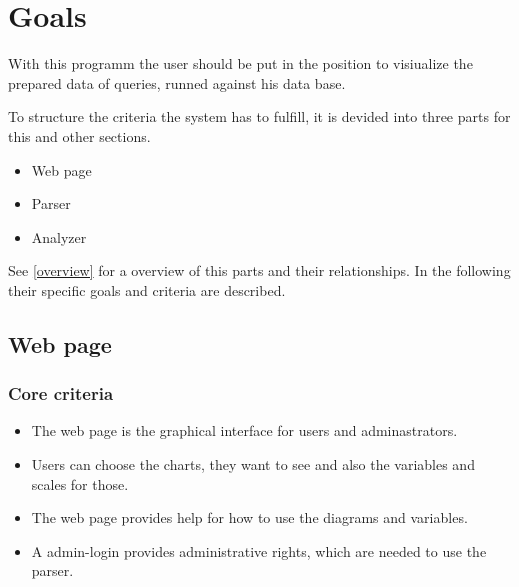 \section{Goals}


With this programm the user should be put in the position 
to visiualize the prepared data of queries, runned against his data base.


To structure the criteria the system has to fulfill, 
it is devided into three parts for this and other sections.
\begin{itemize}
  \item Web page
  \item Parser
  \item Analyzer
\end{itemize}
See \ref{overview} for a overview of this parts and their relationships.
In the following their specific goals and criteria are described.
 

% 


\subsection{Web page}
\subsubsection{Core criteria}
\begin{itemize}
\item The web page is the graphical interface for users and adminastrators.

\item Users can choose the charts, they want to see 
and also the variables and scales for those.

\item The web page provides help for how to use the diagrams and variables.

\item A admin-login provides administrative rights, which are needed to use the parser.
\end{itemize}

